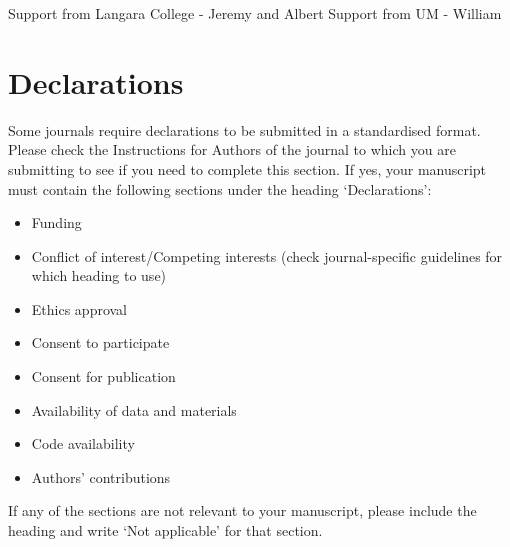 \documentclass[sn-mathphys,Numbered]{sn-jnl}%
\theoremstyle{thmstyleone}%
\theoremstyle{thmstyletwo}%
\theoremstyle{thmstylethree}%
\begin{document}
\backmatter



Support from Langara College - Jeremy and Albert
Support from UM - William



\section*{Declarations}

Some journals require declarations to be submitted in a standardised format. Please check the Instructions for Authors of the journal to which you are submitting to see if you need to complete this section. If yes, your manuscript must contain the following sections under the heading `Declarations':

\begin{itemize}
\item Funding
\item Conflict of interest/Competing interests (check journal-specific guidelines for which heading to use)
\item Ethics approval 
\item Consent to participate
\item Consent for publication
\item Availability of data and materials
\item Code availability 
\item Authors' contributions
\end{itemize}

\noindent
If any of the sections are not relevant to your manuscript, please include the heading and write `Not applicable' for that section. 




\end{document}
